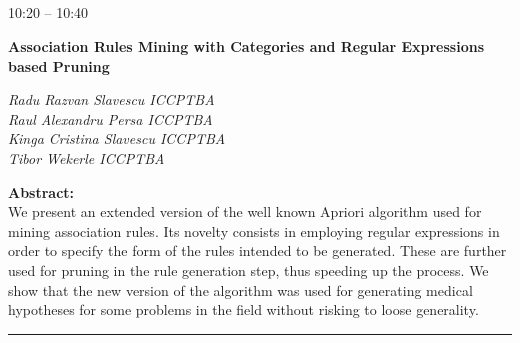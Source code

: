 \vspace*{-36pt}
    \subsection[ 
    	   {\bf Association Rules Mining with Categories and Regular Expressions based Pruning
           } \\
           {\it Radu Razvan Razvan Slavescu, Raul Alexandru Persa, Kinga Cristina Slavescu, Tibor Wekerle
           }
	]
	    {
            }
	    {\small 10:20 -- 10:40} \nopagebreak
	    

\noindent 
{\bf \small Association Rules Mining with Categories and Regular Expressions based Pruning} 
\nopagebreak

\noindent 
{\it \footnotesize
\noindent Radu Razvan Slavescu \hfill ICCPTBA \\
Raul Alexandru Persa \hfill ICCPTBA\\ 
Kinga Cristina Slavescu \hfill ICCPTBA \\
Tibor Wekerle \hfill ICCPTBA \\
} 

\nopagebreak

\noindent 
{\bf \small Abstract:} \\
{\small
We present an extended version of the well known Apriori algorithm used for mining association rules. 
Its novelty consists in employing regular expressions in order to specify the form of the rules intended to be generated.
These are further used for pruning in the rule generation step, thus speeding up the process. 
We show that the new version of the algorithm was used for generating medical hypotheses for some problems in the field without risking to loose generality.
}
            \\ 
            \noindent\rule{\textwidth}{0.4pt}

